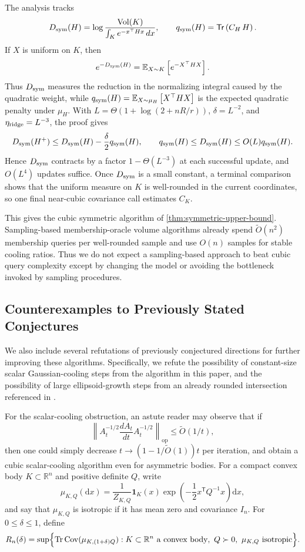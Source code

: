 \documentclass[11pt]{article}
\numberwithin{equation}{section}
\theoremstyle{definition}
\newcommand{\R}{\mathbb{R}}
\newcommand{\Vol}{\mathrm{Vol}}
\renewcommand{\O}{\widetilde{O}}
\newcommand{\E}[2]{\mathbb{E}_{#1}\left[#2\right]}
\newcommand{\Tr}[1]{\mathsf{Tr}\left(#1\right)}
\newcommand{\op}{\mathrm{op}}
\begin{document}
The analysis tracks
\[
D_{\rm sym}(H)=\log\frac{\Vol(K)}{\int_K e^{-x^\top Hx}\,dx},
\qquad
q_{\rm sym}(H)=\Tr{C_H\,H}.
\]
If $X$ is uniform on
$K$, then
\[
 e^{-D_{\rm sym}(H)}=\E{X\sim K}{e^{-X^\top H X}}.
\]
Thus $D_{\rm sym}$ measures the reduction in the normalizing integral caused by
the quadratic weight, while
$q_{\rm sym}(H)=\E{X\sim\mu_H}{X^\top HX}$ is the expected quadratic penalty
under
$\mu_H$.
With $L=\Theta(1+\log(2+nR/r))$,
$\delta=L^{-2}$, and
$\eta_{\rm ridge}=L^{-3}$, the proof gives
\[
D_{\rm sym}(H^+)\leq D_{\rm sym}(H)-\frac{\delta}{2}q_{\rm sym}(H),
\qquad
q_{\rm sym}(H)
\leq D_{\rm sym}(H)
\leq O(L)q_{\rm sym}(H).
\]
Hence $D_{\rm sym}$ contracts by a factor
$1-\Theta(L^{-3})$ at each successful update, and
$O(L^4)$ updates suffice.
Once $D_{\rm sym}$ is a small constant, a terminal comparison shows that the
uniform measure on
$K$ is well-rounded in the current coordinates, so one final near-cubic
covariance call estimates
$C_K$.

This gives the cubic symmetric algorithm of \cref{thm:symmetric-upper-bound}.
Sampling-based membership-oracle volume algorithms already spend $\O(n^2)$
membership queries per well-rounded sample and use
$O(n)$ samples for stable cooling ratios.
Thus we do not expect a sampling-based approach to beat cubic query complexity
except by changing the model or avoiding the bottleneck invoked by sampling
procedures.

\subsection{Counterexamples to Previously Stated Conjectures}

We also include several refutations of previously conjectured directions for
further improving these algorithms.
Specifically, we refute the possibility of constant-size scalar Gaussian-cooling
steps from the algorithm in this paper, and the possibility of large
ellipsoid-growth steps from an already rounded intersection referenced in
\cite{JLLV26:journal}.

For the scalar-cooling obstruction, an astute reader may observe that if
\[
 \left\|A_t^{-1/2}\frac{dA_t}{dt}A_t^{-1/2}\right\|_{\op}\le \O(1/t),
\]
then one could simply decrease $t\to(1-1/\O(1))t$ per iteration, and obtain a
cubic scalar-cooling algorithm even for asymmetric bodies.
For a compact convex body $K\subset\R^n$ and positive definite
$Q$, write
\[
  \mu_{K,Q}(\mathrm dx)
  =\frac{1}{Z_{K,Q}}\mathbf 1_K(x)
    \exp\!\left(-\frac12 x^{\mathsf T}Q^{-1}x\right)\mathrm dx,
\]
and say that $\mu_{K,Q}$ is isotropic if it has mean zero and covariance
$I_n$.
For $0\leq\delta\leq1$, define
\[
  R_n(\delta)
  =\sup\Bigl\{
    \operatorname{Tr}\operatorname{Cov}(\mu_{K,(1+\delta)Q}):
    K\subset\R^n\text{ a convex body},\ Q\succ0,\
    \mu_{K,Q}\text{ isotropic}
  \Bigr\}.
\]
\end{document}
